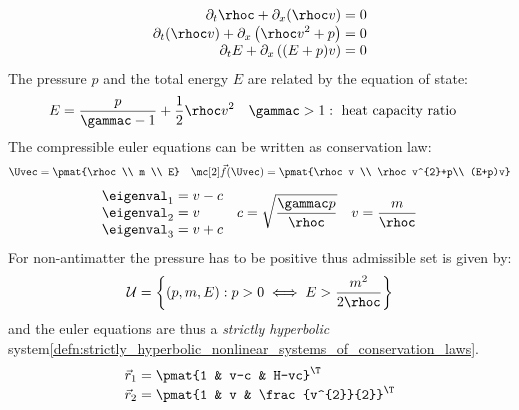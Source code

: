 \begin{examplebox}\nospacing
    \begin{example}\label{example:compressible_euler_equations}
        \begin{align}
          \partial_{t}\rhoc+\partial_{x}(\rhoc v)&=0 \\[-1\jot]
          \partial_{t}(\rhoc v)+\partial_{x}\left(\rhoc v^{2}+p\right)&=0 \\[-1\jot]
          \partial_{t}E+\partial_{x}\left((E+p)v\right)&=0
        \end{align}
        The pressure $p$ and the total energy $E$ are related by the equation of state:
        \begin{align}
          &E=\frac{p}{\gammac-1}+\frac{1}{2}\rhoc v^{2}&&\gammac>1: \text{ heat capacity ratio}
        \end{align}
        The compressible euler equations can be written as conservation law:
        \begin{align*}
          \Uvec=\pmat{\rhoc \\ m \\ E}&&
          \fluxvec(\Uvec)=\pmat{\rhoc v \\  \rhoc v^{2}+p\\ (E+p)v}
        \end{align*}
        \begin{align*}
          \begin{aligned}
            &\eigenval_{1}=v-c \\[-1\jot]
            &\eigenval_{2}=v \\[-1\jot]
            &\eigenval_{3}=v+c
          \end{aligned}&&c=\sqrt{\frac{\gammac p}{\rhoc}}&&v=\frac{m}{\rhoc}
        \end{align*}
        For non-antimatter the pressure has to be positive thus admissible set is given by:
        \begin{align*}
          \admissibleset=\left\{(p,m,E):p>0\iff E>\frac{m^{2}}{2\rhoc}\right\}
        \end{align*}
        and the euler equations are thus a \textit{strictly hyperbolic} system\cref{defn:strictly_hyperbolic_nonlinear_systems_of_conservation_laws}.
        \begin{align*}
            \begin{aligned}
            \vec{r}_{1}&=\pmat{1 & v-c & H-vc}^{\T}\\[-1\jot]
            \vec{r}_{2}&=\pmat{1 & v & \frac{v^{2}}{2}}^{\T} \\[-1\jot]

\end{aligned}
\end{align*}
\end{example}
\end{examplebox}
